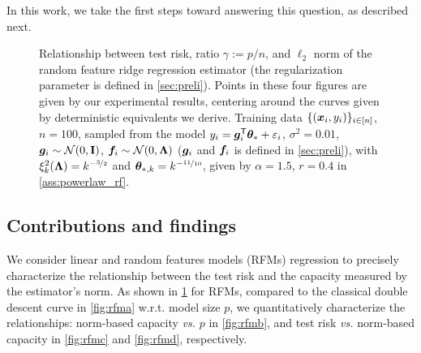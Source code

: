 In this work, we take the first steps toward answering this question, as described next.


\begin{figure}[t]
    \centering
    \vspace{-0.0cm}
    \caption{Relationship between test risk, ratio $\gamma := p/n$, and $\ell_2$ norm of the random feature ridge regression estimator (the regularization parameter is defined in \cref{sec:preli}). Points in these four figures are given by our experimental results, centering around the curves given by deterministic equivalents we derive. Training data \(\{({\boldsymbol x}_i, y_i)\}_{i \in [n]}\), \(n = 100\), sampled from the model \(y_i = {\boldsymbol g}_i^{\mathsf T} {\boldsymbol \theta}_* + \varepsilon_i\), \(\sigma^2 = 0.01\), \({\boldsymbol g}_i \sim \mathcal{N}(0, {\mathbf I})\), \(\boldsymbol{f}_i \sim \mathcal{N}(0, {\boldsymbol \Lambda})\) (\({\boldsymbol g}_i\) and \(\boldsymbol{f}_i\) is defined in \cref{sec:preli}), with \(\xi^2_k({\boldsymbol \Lambda})=k^{-\nicefrac{3}{2}}\) and \({\boldsymbol \theta}_{*,k}=k^{-\nicefrac{11}{10}}\), given by \(\alpha=1.5\), \(r=0.4\) in \cref{ass:powerlaw_rf}.}
    \label{fig:random_feature_risk_vs_norm}
    \vspace{-0.0cm}
\end{figure}


\subsection{Contributions and findings}

We consider linear and random features models (RFMs) regression  to precisely characterize the relationship between the test risk and the capacity  measured by the estimator's norm. 
As shown in \cref{fig:random_feature_risk_vs_norm} for RFMs, compared to the classical double descent curve in \cref{fig:rfma} w.r.t. model size $p$, we quantitatively  characterize the relationships: norm-based capacity \emph{vs.} $p$ in \cref{fig:rfmb}, and test risk \emph{vs.} norm-based capacity in \cref{fig:rfmc} and \ref{fig:rfmd}, respectively.

